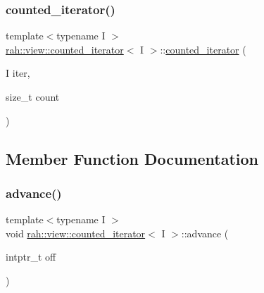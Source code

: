 \subsubsection{\texorpdfstring{counted\_iterator()}{counted\_iterator()}\hspace{0.1cm}{\footnotesize\ttfamily [2/2]}}
{\footnotesize\ttfamily template$<$typename I $>$ \\
\mbox{\hyperlink{structrah_1_1view_1_1counted__iterator}{rah\+::view\+::counted\+\_\+iterator}}$<$ I $>$\+::\mbox{\hyperlink{structrah_1_1view_1_1counted__iterator}{counted\+\_\+iterator}} (\begin{DoxyParamCaption}\item[{I}]{iter,  }\item[{size\+\_\+t}]{count }\end{DoxyParamCaption})\hspace{0.3cm}{\ttfamily [inline]}}



\subsection{Member Function Documentation}
\mbox{\label{structrah_1_1view_1_1counted__iterator_abef44b581abb0c70a79dbd6a61ccd200}} 
\subsubsection{\texorpdfstring{advance()}{advance()}}
{\footnotesize\ttfamily template$<$typename I $>$ \\
void \mbox{\hyperlink{structrah_1_1view_1_1counted__iterator}{rah\+::view\+::counted\+\_\+iterator}}$<$ I $>$\+::advance (\begin{DoxyParamCaption}\item[{intptr\+\_\+t}]{off }\end{DoxyParamCaption})\hspace{0.3cm}{\ttfamily [inline]}}

\mbox{\label{structrah_1_1view_1_1counted__iterator_abeb34df8feb243fce3eec27d45b19aa2}} 
